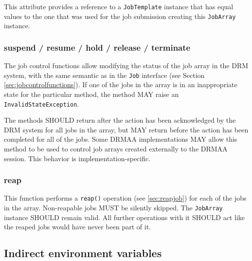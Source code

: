 \documentclass{article}
\newcommand{\h}[1]{\lstinline|#1|}
\newcommand{\rat}[1]{}
\begin{document}
This attribute provides a reference to a \h{JobTemplate} instance that has equal values to the one that was used for the job submission creating this \h{JobArray} instance.

\rat{
The use case from SAGA perspective is that the user can easily resubmit the same job - just changing for example some command line parameter, but leaving the remainder fixed (mail by Andre Merzky, July 29th 2010).
}

\subsubsection{suspend / resume / hold / release / terminate}

The job control functions allow modifying the status of the job array in the DRM system, with the same semantic as in the \h{Job} interface (see Section \ref{sec:jobcontrolfunctions}). If one of the jobs in the array is in an inappropriate state for the particular method, the method MAY raise an \h{InvalidStateException}.

The methods SHOULD return after the action has been acknowledged by the DRM system for all jobs in the array, but MAY return before the action has been completed for all of the jobs. Some DRMAA implementations MAY allow this method to be used to control job arrays created externally to the DRMAA session. This behavior is implementation-specific.

\rat{We were asked to make explicit that some of these functions may not be atomic. However, this holds for most methods, and is not supported to be a part of the API standard.}

\subsubsection{reap}
\label{sec:reapjobarray}

This function performs a \h{reap()} operation (see \ref{sec:reapjob}) for each of the jobs in the array. Non-reapable jobs MUST be silently skipped. The \h{JobArray} instance SHOULD remain valid. All further operations with it SHOULD act like the reaped jobs would have never been part of it.

\rat{
	This is supposed to have exactly the same semantics as a looped reap() execution for all the array jobs. We introduced this function to give the implementation the chance for some performance optimization.
}

\subsection{Indirect environment variables}
\label{sec:drmaaindex}
\end{document}
